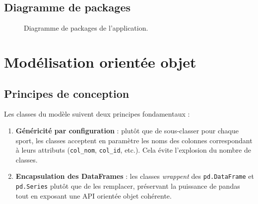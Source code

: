 \documentclass[12pt,a4paper]{article}
\newcommand{\code}[1]{\texttt{#1}}
\begin{document}
\subsection{Diagramme de packages}

\begin{figure}[h!]
\centering
{}
\caption{Diagramme de packages de l'application.}
\label{fig:packages}
\end{figure}

\section{Modélisation orientée objet}
\label{sec:model}

\subsection{Principes de conception}

Les classes du modèle suivent deux principes fondamentaux :

\begin{enumerate}
  \item \textbf{Généricité par configuration} : plutôt que de sous-classer pour
        chaque sport, les classes acceptent en paramètre les noms des colonnes
        correspondant à leurs attributs (\code{col\_nom}, \code{col\_id}, etc.).
        Cela évite l'explosion du nombre de classes.
  \item \textbf{Encapsulation des DataFrames} : les classes \textit{wrappent}
        des \code{pd.DataFrame} et \code{pd.Series} plutôt que de les remplacer,
        préservant la puissance de pandas tout en exposant une API orientée
        objet cohérente.
\end{enumerate}
\end{document}
